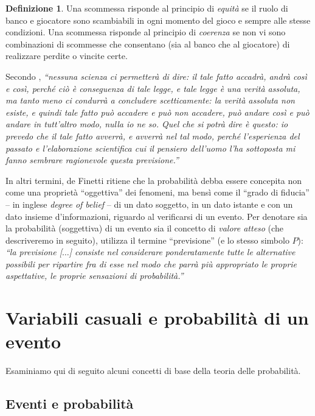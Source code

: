 \documentclass[
  11pt,
]{krantz}
\theoremstyle{definition}
\newtheorem{definition}{Definizione}[chapter]
\theoremstyle{definition}
\theoremstyle{definition}
\theoremstyle{definition}
\theoremstyle{remark}
\begin{document}
\begin{definition}
Una scommessa risponde al principio di \emph{equità} se il ruolo di banco e giocatore sono scambiabili in ogni momento del gioco e sempre alle stesse condizioni. Una scommessa risponde al principio di \emph{coerenza} se non vi sono combinazioni di scommesse che consentano (sia al banco che al giocatore) di realizzare perdite o vincite certe.
\end{definition}

Secondo \citet{definetti1931prob}, \emph{``nessuna scienza ci permetterà di dire: il tale fatto accadrà, andrà così e così, perché ciò è conseguenza di tale legge, e tale legge è una verità assoluta, ma tanto meno ci condurrà a concludere scetticamente: la verità assoluta non esiste, e quindi tale fatto può accadere e può non accadere, può andare così e può andare in tutt'altro modo, nulla io ne so. Quel che si potrà dire è questo: io prevedo che il tale fatto avverrà, e avverrà nel tal modo, perché l'esperienza del passato e l'elaborazione scientifica cui il pensiero dell'uomo l'ha sottoposta mi fanno sembrare ragionevole questa previsione.''}

In altri termini, de Finetti ritiene che la probabilità debba essere concepita non come una proprietà ``oggettiva'' dei fenomeni, ma bensì come il ``grado di fiducia'' -- in inglese \emph{degree of belief} -- di un dato soggetto, in un dato istante e con un dato insieme d'informazioni, riguardo al verificarsi di un evento. Per denotare sia la probabilità (soggettiva) di un evento sia il concetto di \emph{valore atteso} (che descriveremo in seguito), \citet{definetti1970teoria} utilizza il termine ``previsione'' (e lo stesso simbolo \(P\)): \emph{``la previsione {[}\(\dots\){]} consiste nel considerare ponderatamente tutte le alternative possibili per ripartire fra di esse nel modo che parrà più appropriato le proprie aspettative, le proprie sensazioni di probabilità.''}

\hypertarget{variabili-casuali-e-probabilituxe0-di-un-evento}{%
\section{Variabili casuali e probabilità di un evento}\label{variabili-casuali-e-probabilituxe0-di-un-evento}}

Esaminiamo qui di seguito alcuni concetti di base della teoria delle probabilità.

\hypertarget{eventi-e-probabilituxe0}{%
\subsection{Eventi e probabilità}\label{eventi-e-probabilituxe0}}
\end{document}
